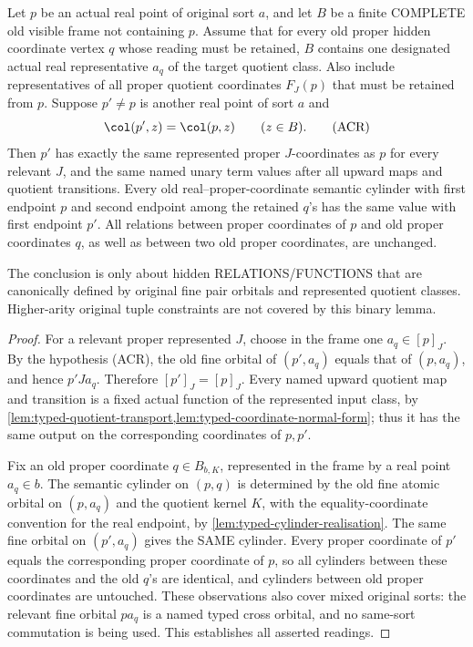 \begin{lemma}
\label{lem:typed-anchored-real-clone-readout}
Let \(p\) be an actual real point of original
sort \(a\), and let \(B\) be a finite
COMPLETE old visible frame not containing
\(p\). Assume that for every old proper
hidden coordinate vertex \(q\) whose
reading must be retained, \(B\) contains
one designated actual real representative
\(a_q\) of the target quotient class.
Also include representatives of all
proper quotient coordinates \(F_J(p)\)
that must be retained from \(p\).
Suppose \(p'\ne p\) is another real point
of sort \(a\) and
\[
       \col(p',z)=\col(p,z)\qquad(z\in B).
\tag{ACR}\label{eq:typed-anchor-clone-reading}
\]
Then \(p'\) has exactly the same
represented proper \(J\)-coordinates as
\(p\) for every relevant \(J\), and
the same named unary term values after
all upward maps and quotient transitions.
Every old real--proper-coordinate
semantic cylinder with first endpoint
\(p\) and second endpoint among
the retained \(q\)'s has the same
value with first endpoint \(p'\).
All relations between proper coordinates
of \(p\) and old proper coordinates
\(q\), as well as between two
old proper coordinates, are unchanged.

The conclusion is only about hidden
RELATIONS/FUNCTIONS that are canonically
defined by original fine pair orbitals
and represented quotient classes.
Higher-arity original tuple constraints
are not covered by this binary lemma.
\end{lemma}
\begin{proof}
For a relevant proper represented
\(J\), choose in the frame one
\(a_q\in[p]_J\).
By the hypothesis (ACR),
the old fine orbital of
\((p',a_q)\) equals that of
\((p,a_q)\), and hence
\(p'J a_q\). Therefore
\([p']_J=[p]_J\).
Every named upward quotient map
and transition is a fixed actual
function of the represented input
class, by
\cref{lem:typed-quotient-transport,lem:typed-coordinate-normal-form};
thus it has the same output on
the corresponding coordinates of
\(p,p'\).

Fix an old proper coordinate
\(q\in B_{b,K}\), represented in
the frame by a real point
\(a_q\in b\). The semantic
cylinder on \((p,q)\)
is determined by the old fine
atomic orbital on \((p,a_q)\)
and the quotient kernel \(K\),
with the equality-coordinate
convention for the real endpoint,
by \cref{lem:typed-cylinder-realisation}.
The same fine orbital on
\((p',a_q)\) gives the SAME
cylinder. Every proper coordinate
of \(p'\) equals the corresponding
proper coordinate of \(p\), so
all cylinders between these
coordinates and the old \(q\)'s
are identical, and cylinders
between old proper coordinates
are untouched. These
observations also cover mixed
original sorts: the relevant
fine orbital \(p a_q\) is a
named typed cross orbital,
and no same-sort commutation
is being used. This establishes
all asserted readings.
\end{proof}

